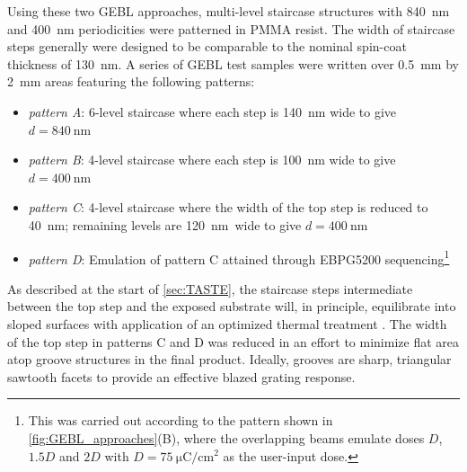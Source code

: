 Using these two GEBL approaches, multi-level staircase structures with \SI{840}{\nm} and \SI{400}{\nm} periodicities were patterned in PMMA resist. 
The width of staircase steps generally were designed to be comparable to the nominal spin-coat thickness of \SI{130}{\nm}. 
A series of GEBL test samples were written over \SI{0.5}{\mm} by \SI{2}{\mm} areas featuring the following patterns:
\begin{itemize}[noitemsep] 
 \item \emph{pattern A}: 6-level staircase where each step is \SI{140}{\nm} wide to give $d = \SI{840}{\nm}$
 \item \emph{pattern B}: 4-level staircase where each step is \SI{100}{\nm} wide to give $d = \SI{400}{\nm}$
 \item \emph{pattern C}: 4-level staircase where the width of the top step is reduced to \SI{40}{\nm}; remaining levels are \SI{120}{\nm} wide to give $d = \SI{400}{\nm}$
 \item \emph{pattern D}: Emulation of pattern C attained through \textsc{EBPG5200} sequencing\footnote{This was carried out according to the pattern shown in \cref{fig:GEBL_approaches}(B), where the overlapping beams emulate doses $D$, $1.5D$ and $2D$ with $D = \SI{75}{\micro\coulomb\per\cm\squared}$ as the user-input dose.}
 \end{itemize}%
As described at the start of \cref{sec:TASTE}, the staircase steps intermediate between the top step and the exposed substrate will, in principle, equilibrate into sloped surfaces with application of an optimized thermal treatment \cite{Schleunitz11a,Schleunitz14}. 
The width of the top step in patterns C and D was reduced in an effort to minimize flat area atop groove structures in the final product. 
Ideally, grooves are sharp, triangular sawtooth facets to provide an effective blazed grating response. 


